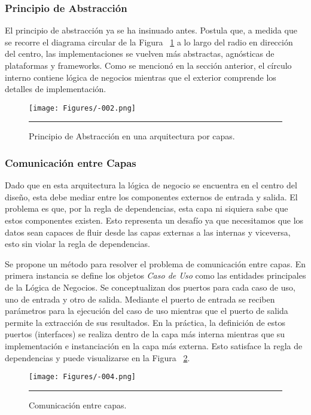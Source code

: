 \subsubsection{Principio de Abstracción}
El principio de abstracción ya se ha insinuado antes. Postula que, a medida que se recorre el diagrama circular de la Figura ~\ref{fig:C2_PA} a lo largo del radio en dirección del centro, las implementaciones se vuelven más abstractas, agnósticas de plataformas y frameworks. Como se mencionó en la sección anterior, el círculo interno contiene lógica de negocios mientras que el exterior comprende los detalles de implementación.

\begin{figure}[htbp]
	\centering
	\texttt{[image: Figures/-002.png]}
	\rule{35em}{1pt}
	\caption[Abstraction Principle]{Principio de Abstracción en una arquitectura por capas.}
	\label{fig:C2_PA}
\end{figure}

\subsubsection{Comunicación entre Capas}
Dado que en esta arquitectura la lógica de negocio se encuentra en el centro del diseño, esta debe mediar entre los componentes externos de entrada y salida.
El problema es que, por la regla de dependencias, esta capa ni siquiera sabe que estos componentes existen.
Esto representa un desafío ya que necesitamos que los datos sean capaces de fluir desde las capas externas a las internas y viceversa, esto sin violar la regla de dependencias.


Se propone un método para resolver el problema de comunicación entre capas.
En primera instancia se define los objetos \emph{Caso de Uso} como las entidades principales de la Lógica de Negocios.
Se conceptualizan dos puertos para cada caso de uso, uno de entrada y otro de salida.
Mediante el puerto de entrada se reciben parámetros para la ejecución del caso de uso mientras que el puerto de salida permite la extracción de sus resultados.
En la práctica, la definición de estos puertos (interfaces) se realiza dentro de la capa más interna mientras que su implementación e instanciación en la capa más externa. Esto satisface la regla de dependencias y puede visualizarse en la Figura ~\ref{fig:C2_CC_01}.


\begin{figure}[htbp]
	\centering
	\texttt{[image: Figures/-004.png]}
	\rule{35em}{1pt}
	\caption[Layer Communication]{Comunicación entre capas.}
	\label{fig:C2_CC_01}
\end{figure}


